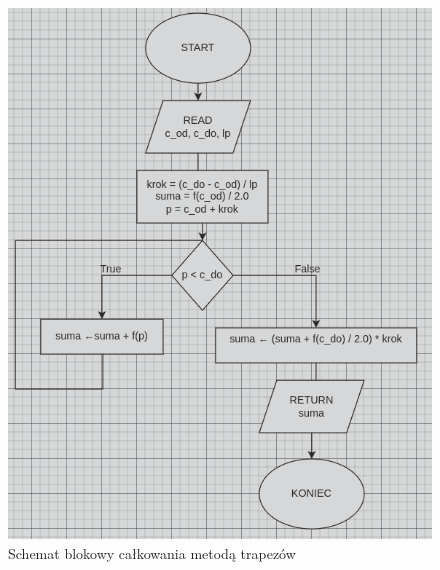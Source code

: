 \documentclass{article}
\begin{document}
\begin{figure}[H]
  \centering
  \includegraphics[width=\textwidth]{"../assets/trapez.png"}
  \caption{Schemat blokowy całkowania metodą trapezów}
  \label{fig:block_diagram_trapez}
\end{figure}
\end{document}
